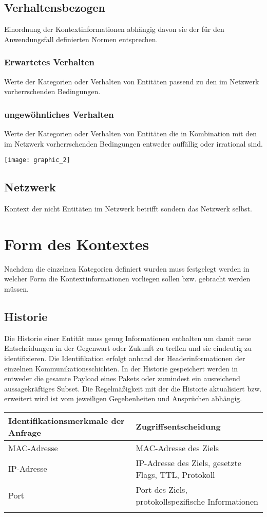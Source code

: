 \subsection{Verhaltensbezogen}
Einordnung der Kontextinformationen abhängig davon sie der für den Anwendungsfall definierten Normen entsprechen.
\subsubsection{Erwartetes Verhalten}
Werte der Kategorien oder Verhalten von Entitäten passend  zu den im Netzwerk vorherrschenden Bedingungen.
\subsubsection{ungewöhnliches Verhalten}
Werte der Kategorien oder Verhalten von Entitäten die in Kombination mit den im Netzwerk vorherrschenden Bedingungen entweder auffällig oder irrational sind.

\newpage
\texttt{[image: graphic\_2]}

\subsection{Netzwerk}
Kontext der nicht Entitäten im Netzwerk betrifft sondern das Netzwerk selbst. 
\section{Form des Kontextes}
Nachdem die einzelnen Kategorien definiert wurden muss festgelegt werden in welcher Form die Kontextinformationen vorliegen sollen bzw. gebracht werden müssen.

\subsection{Historie}
Die Historie einer Entität muss genug Informationen enthalten um damit neue Entscheidungen in der Gegenwart oder Zukunft zu treffen und sie eindeutig zu identifizieren. Die Identifikation erfolgt anhand der Headerinformationen der einzelnen  Kommunikationsschichten. In der Historie gespeichert werden in entweder die gesamte Payload eines Pakets oder zumindest ein ausreichend aussagekräftiges Subset. Die Regelmäßigkeit mit der die Historie aktualisiert bzw. erweitert wird ist vom jeweiligen Gegebenheiten und Ansprüchen abhängig.
\begin{tabularx}{1\textwidth} { 
  | >{\raggedright\arraybackslash}X 
  | >{\raggedright\arraybackslash}X 
  | }
 \hline
 Identifikationsmerkmale der Anfrage & Zugriffsentscheidung \\
 \hline
 MAC-Adresse & MAC-Adresse des Ziels  \\\hline
 IP-Adresse &  IP-Adresse des Ziels, gesetzte Flags, TTL, Protokoll \\\hline
 Port & Port des Ziels, protokollspezifische Informationen\\
 		& 			\\
\hline
\end{tabularx}


